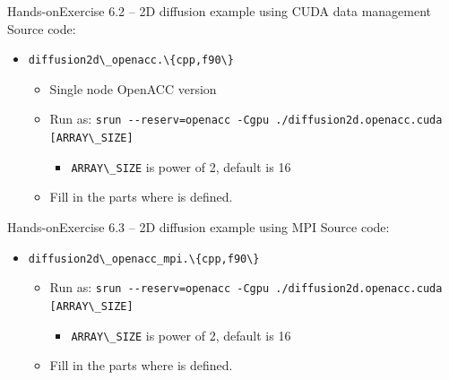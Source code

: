 \documentclass[12pt,aspectratio=169]{beamer}
\newcommand\shinline[2][]{\lstinline[style=shstyle,basicstyle=\ttfamily,#1]!#2!}
\begin{document}
\begin{frame}[fragile]{Hands-on}{Exercise 6.2 -- 2D diffusion example using CUDA data management}
  Source code:
  \begin{itemize}
  \item \shinline{diffusion2d\_openacc.\{cpp,f90\}}
    \begin{itemize}
    \item Single node OpenACC version
      \item Run as: \shinline{srun --reserv=openacc -Cgpu ./diffusion2d.openacc.cuda [ARRAY\_SIZE]}
        \begin{itemize}
        \item \shinline{ARRAY\_SIZE} is power of 2, default is 16
        \end{itemize}
      \item Fill in the parts where  is defined.
    \end{itemize}
  \end{itemize}
\end{frame}

\begin{frame}[fragile]{Hands-on}{Exercise 6.3 -- 2D diffusion example using MPI}
  Source code:
  \begin{itemize}
  \item \shinline{diffusion2d\_openacc_mpi.\{cpp,f90\}}
    \begin{itemize}
      \item Run as: \shinline{srun --reserv=openacc -Cgpu ./diffusion2d.openacc.cuda [ARRAY\_SIZE]}
        \begin{itemize}
        \item \shinline{ARRAY\_SIZE} is power of 2, default is 16
        \end{itemize}
      \item Fill in the parts where  is defined.
    \end{itemize}
  \end{itemize}
\end{frame}

\end{document}
